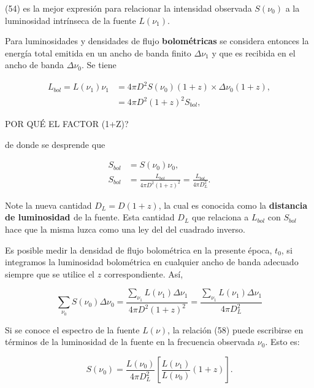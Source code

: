 \documentclass[11pt]{article}
\begin{document}
    (54) es la mejor expresión para relacionar la intensidad observada $S(\nu_0)$ a la luminosidad intrínseca de la fuente $L(\nu_1)$. 
    
    Para luminosidades y densidades de flujo {\bf{bolométricas}} se considera entonces la energía total emitida en un ancho de banda finito $\Delta \nu_1$ y que es recibida en el ancho de banda $\Delta \nu_0$. Se tiene
    
    \begin{align}
        L_{bol}= L (\nu_1) \nu_1 & = 4 \pi D^2 S(\nu_0)(1+z) \times \Delta \nu_0 (1+z), \\
        & = 4 \pi D^2 (1+z)^2 S_{bol},
    \end{align}

    POR QUÉ EL FACTOR (1+Z)? 

    de donde se desprende que 
    
    \begin{align}
        S_{bol} & = S(\nu_0) \nu_0, \\
        S_{bol}  & = \frac{L_{bol}}{4 \pi D^2 (1+z)^2} =  \frac{L_{bol}}{4 \pi D_L^2}.
    \end{align}
    
    Note la nueva cantidad $D_L =  D (1+z) $, la cual es conocida como la {\bf{distancia de luminosidad }} de la fuente. Esta cantidad $D_L$ que relaciona a $L_{bol}$ con $S_{bol}$ hace que la misma luzca como una ley del  del cuadrado inverso. 
    
    Es posible medir la densidad de flujo bolométrica en la presente época, $t_0$, si integramos la luminosidad bolométrica en cualquier ancho de banda adecuado siempre que se utilice el $z$  correspondiente. Así, 
    
    \begin{equation}
        \sum_{\nu_0} S(\nu_0) \Delta \nu_0 = \frac{ \sum_{\nu_1} L(\nu_1) \Delta \nu_1 }{4 \pi D^2 (1+z)^2} =   \frac{\sum_{\nu_1} L(\nu_1) \Delta \nu_1}{4 \pi D_L^2}
    \end{equation}
    
    Si se conoce el espectro de la fuente $L(\nu)$, la relación (58) puede escribirse en términos de la luminosidad de la fuente en la frecuencia observada $\nu_0$. Esto es:
    
    \begin{equation}
        S(\nu_0) = \frac{L(\nu_0)}{4\pi D_L^2} \left[ \frac{L(\nu_1)}{L(\nu_0)}(1+z) \right]. 
    \end{equation}
    
\end{document}
